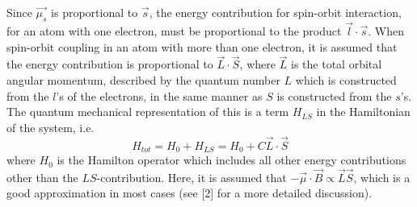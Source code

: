 \documentclass[a4paper]{article}
\begin{document}
Since $\vec{\mu_s}$ is proportional to $\vec{s}$, the energy contribution for spin-orbit interaction, for an atom with one electron, must be proportional to the product $\vec{l} \cdot \vec{s}$. When spin-orbit coupling in an atom with more than one electron, it is assumed that the energy contribution is proportional to $\vec{L}\cdot\vec{S}$, where $\vec{L}$ is the total orbital angular momentum, described by the quantum number $L$ which is constructed from the $l$'s of the electrons, in the same manner as $S$ is constructed from the $s$'s. The quantum mechanical representation of this is a term $H_{LS}$ in the Hamiltonian of the system, i.e.
\begin{equation}
H_{tot} = H_0 + H_{LS} = H_0 + C \vec{L}\cdot\vec{S}
\end{equation}
where $H_0$ is the Hamilton operator which includes all other energy contributions other than the $LS$-contribution. Here, it is assumed that $-\vec{\mu}\cdot\vec{B}\propto\vec{L}\vec{S}$, which is a good approximation in most cases (see [2] for a more detailed discussion).
\end{document}
